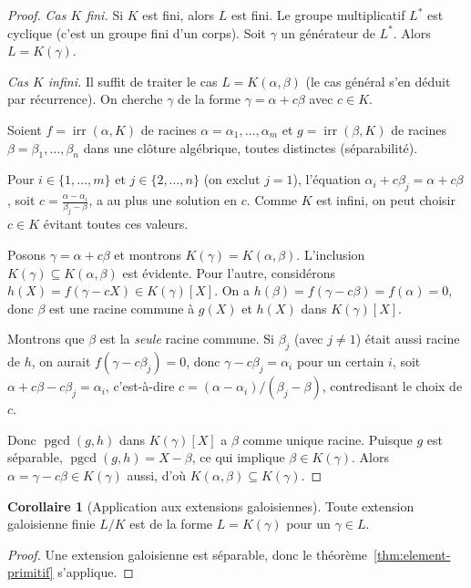 \documentclass[12pt,a4paper,openany]{book}
\theoremstyle{definition}
\newtheorem{corollaire}{Corollaire}[chapter]
\newcommand{\irr}{\operatorname{irr}}
\newcommand{\pgcd}{\operatorname{pgcd}}
\begin{document}
\begin{proof}
\emph{Cas $K$ fini.} Si $K$ est fini, alors $L$ est fini. Le groupe
multiplicatif $L^*$ est cyclique (c'est un groupe fini d'un corps).
Soit $\gamma$ un générateur de $L^*$. Alors $L = K(\gamma)$.

\medskip\noindent
\emph{Cas $K$ infini.} Il suffit de traiter le cas $L = K(\alpha, \beta)$
(le cas général s'en déduit par récurrence). On cherche $\gamma$ de la forme
$\gamma = \alpha + c\beta$ avec $c \in K$.

Soient $f = \irr(\alpha, K)$ de racines $\alpha = \alpha_1, \ldots, \alpha_m$
et $g = \irr(\beta, K)$ de racines $\beta = \beta_1, \ldots, \beta_n$ dans
une clôture algébrique, toutes distinctes (séparabilité).

Pour $i \in \{1, \ldots, m\}$ et $j \in \{2, \ldots, n\}$ (on exclut
$j = 1$), l'équation $\alpha_i + c\beta_j = \alpha + c\beta$, soit
$c = \frac{\alpha - \alpha_i}{\beta_j - \beta}$, a au plus une solution
en $c$. Comme $K$ est infini, on peut choisir $c \in K$ évitant toutes
ces valeurs.

Posons $\gamma = \alpha + c\beta$ et montrons $K(\gamma) = K(\alpha,\beta)$.
L'inclusion $K(\gamma) \subseteq K(\alpha,\beta)$ est évidente. Pour
l'autre, considérons $h(X) = f(\gamma - cX) \in K(\gamma)[X]$.
On a $h(\beta) = f(\gamma - c\beta) = f(\alpha) = 0$, donc $\beta$ est une
racine commune à $g(X)$ et $h(X)$ dans $K(\gamma)[X]$.

Montrons que $\beta$ est la \emph{seule} racine commune. Si $\beta_j$
(avec $j \neq 1$) était aussi racine de $h$, on aurait
$f(\gamma - c\beta_j) = 0$, donc $\gamma - c\beta_j = \alpha_i$ pour un
certain $i$, soit $\alpha + c\beta - c\beta_j = \alpha_i$, c'est-à-dire
$c = (\alpha - \alpha_i)/(\beta_j - \beta)$, contredisant le choix de $c$.

Donc $\pgcd(g, h)$ dans $K(\gamma)[X]$ a $\beta$ comme unique racine.
Puisque $g$ est séparable, $\pgcd(g, h) = X - \beta$, ce qui implique
$\beta \in K(\gamma)$. Alors $\alpha = \gamma - c\beta \in K(\gamma)$
aussi, d'où $K(\alpha,\beta) \subseteq K(\gamma)$.
\end{proof}

\begin{corollaire}[Application aux extensions galoisiennes]\label{cor:element-primitif-galois}
Toute extension galoisienne finie $L/K$ est de la forme $L = K(\gamma)$
pour un $\gamma \in L$.
\end{corollaire}

\begin{proof}
Une extension galoisienne est séparable, donc le théorème~\ref{thm:element-primitif} s'applique.
\end{proof}
\end{document}
